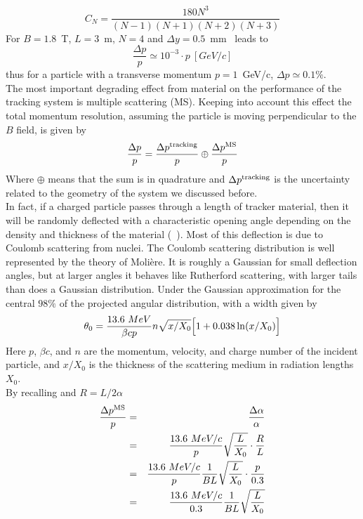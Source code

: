 \begin{equation}
  C_{N}=\frac{180 N^3}{(N-1)(N+1)(N+2)(N+3)}
\end{equation}
For $B=1.8$~T, $L=3$~m, $N=4$ and $\Delta y=0.5$~mm~ leads to
\begin{equation}
  \frac{\Delta p}{p}\simeq 10^{-3}\cdot p~[GeV/c]
\end{equation}
thus for a particle with a transverse momentum $p=1$~GeV/c, $\Delta p\simeq0.1\%$.\\
The most important degrading effect from material on the performance of the
tracking system is multiple scattering (MS). Keeping into account this effect
the total momentum resolution, assuming the particle is moving perpendicular to
the $B$ field, is given by
\begin{equation}
  \frac{\Delta p}{p}=\frac{\Delta p^{\rm tracking}}{p}\oplus\frac{\Delta p^{\rm MS}}{p}
\end{equation}
Where $\oplus$ means that the sum is in quadrature and $\Delta p^{\rm tracking}$
is
the uncertainty related to the geometry of the system we discussed before.\\
In fact, if a charged particle passes through a length of tracker material, then
it will be randomly deflected with a characteristic opening angle depending on
the density and thickness of the material (~). Most of
this deflection is due to Coulomb scattering from nuclei. The Coulomb scattering
distribution is well represented by the theory of Moli\`ere. It is roughly a
Gaussian for small deflection angles, but at larger angles it behaves like
Rutherford scattering, with larger tails than does a Gaussian
distribution. Under the Gaussian approximation for the central $98\%$ of the
projected angular distribution, with a width given by
\begin{equation}
  \theta_{0}= \frac{13.6~MeV}{\beta cp}n\sqrt{x/X_{0}}\Bigl[1+0.038\ln(x/X_{0}) \Bigr]
\end{equation}
Here $p$, $\beta c$, and $n$ are the momentum, velocity, and charge number of
the incident particle, and $x/X_0$ is the thickness of the
scattering medium in radiation lengths $X_{0}$.\\
By recalling  and $R=L/2\alpha$
\begin{eqnarray}\label{err_ms}
  \frac{\Delta p^{\rm MS}}{p}&=&\frac{\Delta \alpha}{\alpha} \nonumber\\
                             &=&\frac{13.6~MeV/c}{p}\sqrt{\frac{L}{X_0}}\cdot \frac{R}{L}\nonumber\\
                             &=&\frac{13.6~MeV/c}{p}\frac{1}{BL}\sqrt{\frac{L}{X_0}}\cdot \frac{p}{0.3}\nonumber\\
                             &=&\frac{13.6~MeV/c}{0.3}\frac{1}{BL}\sqrt{\frac{L}{X_{0}}}
\end{eqnarray}
